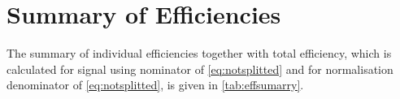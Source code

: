 

\section{Summary of Efficiencies}
\label{EfficiencySummary}

The summary of individual efficiencies together with total efficiency, which is calculated for signal using nominator of \autoref{eq:notsplitted} and for normalisation denominator of \autoref{eq:notsplitted}, is given in \autoref{tab:effsumarry}.
